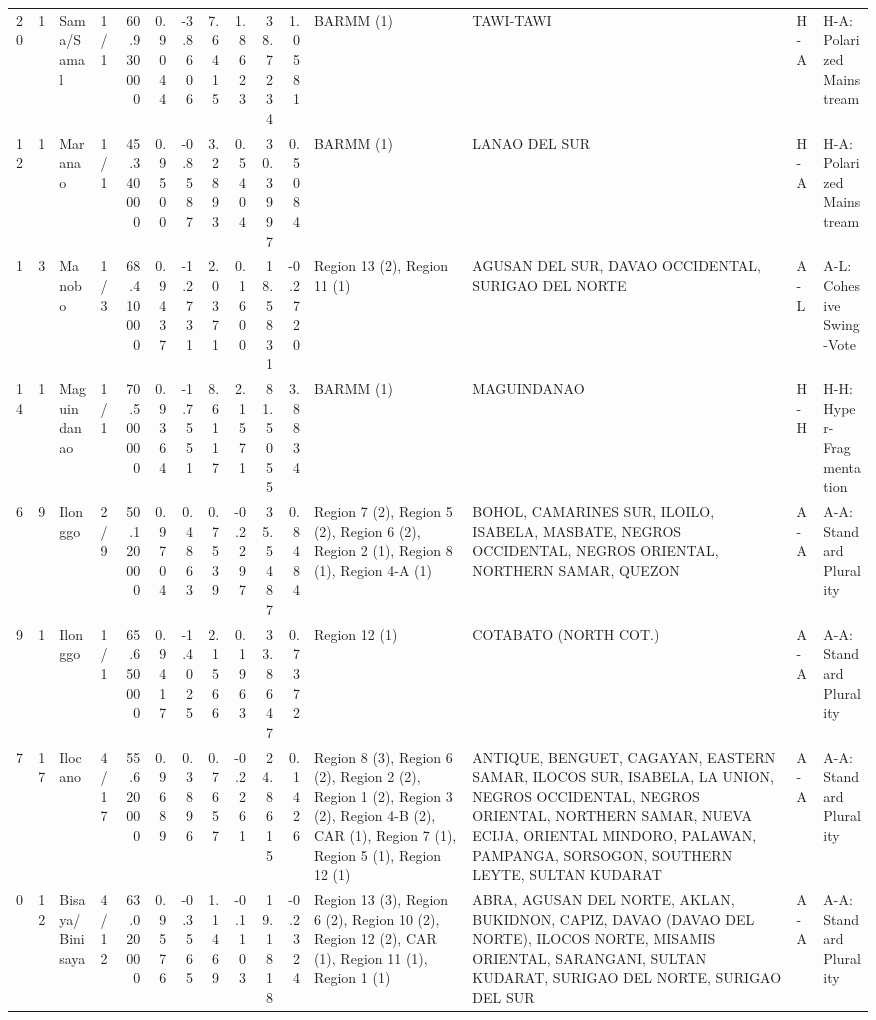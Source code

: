 \begin{tabular}{rrllrrrrrrrllll}
20 & 1 & Sama/Samal & 1/1 & {\cellcolor[HTML]{F4C6AF}} \color[HTML]{000000} 60.930000 & 0.9044 & -3.8606 & 7.6415 & 1.8623 & 38.7234 & 1.0581 & BARMM (1) & TAWI-TAWI & H-A & H-A: Polarized Mainstream \\
12 & 1 & Maranao & 1/1 & {\cellcolor[HTML]{3B4CC0}} \color[HTML]{F1F1F1} 45.340000 & 0.9500 & -0.8587 & 3.2893 & 0.5404 & 30.3997 & 0.5084 & BARMM (1) & LANAO DEL SUR & H-A & H-A: Polarized Mainstream \\
1 & 3 & Manobo & 1/3 & {\cellcolor[HTML]{D1493F}} \color[HTML]{F1F1F1} 68.410000 & 0.9437 & -1.2731 & 2.0371 & 0.1600 & 18.5831 & -0.2720 & Region 13 (2), Region 11 (1) & AGUSAN DEL SUR, DAVAO OCCIDENTAL, SURIGAO DEL NORTE & A-L & A-L: Cohesive Swing-Vote \\
14 & 1 & Maguindanao & 1/1 & {\cellcolor[HTML]{B40426}} \color[HTML]{F1F1F1} 70.500000 & 0.9364 & -1.7551 & 8.6117 & 2.1571 & 81.5055 & 3.8834 & BARMM (1) & MAGUINDANAO & H-H & H-H: Hyper-Fragmentation \\
6 & 9 & Ilonggo & 2/9 & {\cellcolor[HTML]{779AF7}} \color[HTML]{F1F1F1} 50.120000 & 0.9704 & 0.4863 & 0.7539 & -0.2297 & 35.5487 & 0.8484 & Region 7 (2), Region 5 (2), Region 6 (2), Region 2 (1), Region 8 (1), Region 4-A (1) & BOHOL, CAMARINES SUR, ILOILO, ISABELA, MASBATE, NEGROS OCCIDENTAL, NEGROS ORIENTAL, NORTHERN SAMAR, QUEZON & A-A & A-A: Standard Plurality \\
9 & 1 & Ilonggo & 1/1 & {\cellcolor[HTML]{EC8165}} \color[HTML]{F1F1F1} 65.650000 & 0.9417 & -1.4025 & 2.1566 & 0.1963 & 33.8647 & 0.7372 & Region 12 (1) & COTABATO (NORTH COT.) & A-A & A-A: Standard Plurality \\
7 & 17 & Ilocano & 4/17 & {\cellcolor[HTML]{C3D5F4}} \color[HTML]{000000} 55.620000 & 0.9689 & 0.3896 & 0.7657 & -0.2261 & 24.8615 & 0.1426 & Region 8 (3), Region 6 (2), Region 2 (2), Region 1 (2), Region 3 (2), Region 4-B (2), CAR (1), Region 7 (1), Region 5 (1), Region 12 (1) & ANTIQUE, BENGUET, CAGAYAN, EASTERN SAMAR, ILOCOS SUR, ISABELA, LA UNION, NEGROS OCCIDENTAL, NEGROS ORIENTAL, NORTHERN SAMAR, NUEVA ECIJA, ORIENTAL MINDORO, PALAWAN, PAMPANGA, SORSOGON, SOUTHERN LEYTE, SULTAN KUDARAT & A-A & A-A: Standard Plurality \\
0 & 12 & Bisaya/ Binisaya & 4/12 & {\cellcolor[HTML]{F7AC8E}} \color[HTML]{000000} 63.020000 & 0.9576 & -0.3565 & 1.1469 & -0.1103 & 19.1818 & -0.2324 & Region 13 (3), Region 6 (2), Region 10 (2), Region 12 (2), CAR (1), Region 11 (1), Region 1 (1) & ABRA, AGUSAN DEL NORTE, AKLAN, BUKIDNON, CAPIZ, DAVAO (DAVAO DEL NORTE), ILOCOS NORTE, MISAMIS ORIENTAL, SARANGANI, SULTAN KUDARAT, SURIGAO DEL NORTE, SURIGAO DEL SUR & A-A & A-A: Standard Plurality \\

\end{tabular}

